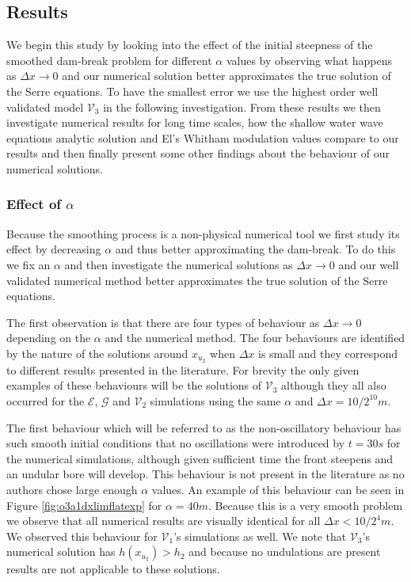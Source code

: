 \documentclass[SingleSpace,12pt,Journal]{Serre_ASCE}
\begin{document}

\subsection{Results}

We begin this study by looking into the effect of the initial steepness of the smoothed dam-break problem for different $\alpha$ values by observing what happens as $\Delta x \rightarrow 0$ and our numerical solution better approximates the true solution of the Serre equations. To have the smallest error we use the highest order well validated model $\mathcal{V}_3$ in the following investigation. From these results we then investigate numerical results for long time scales, how the shallow water wave equations analytic solution and El's Whitham modulation values compare to our results and then finally present some other findings about the behaviour of our numerical solutions.

\subsubsection{Effect of $\alpha$}
Because the smoothing process is a non-physical numerical tool we first study its effect by decreasing $\alpha$ and thus better approximating the dam-break. To do this we fix an $\alpha$ and then investigate the numerical solutions as $\Delta x \rightarrow 0$ and our well validated numerical method better approximates the true solution of the Serre equations. 

The first observation is that there are four types of behaviour as $\Delta x \rightarrow 0$ depending on the $\alpha$ and the numerical method. The four behaviours are identified by the nature of the solutions around $x_{u_2}$ when $\Delta x$ is small and they correspond to different results presented in the literature. For brevity the only given examples of these behaviours will be the solutions of $\mathcal{V}_3$ although they all also occurred for the $\mathcal{E}$, $\mathcal{G}$ and $\mathcal{V}_2$ simulations using the same $\alpha$ and $\Delta x = 10/2^{10}m$.

The first behaviour which will be referred to as the non-oscillatory behaviour has such smooth initial conditions that no oscillations were introduced by $t= 30s$ for the numerical simulations, although given sufficient time the front steepens and an undular bore will develop. This behaviour is not present in the literature as no authors chose large enough $\alpha$ values. An example of this behaviour can be seen in Figure \ref{fig:o3a1dxlimflatexp} for $\alpha = 40m$. Because this is a very smooth problem we observe that all numerical results are visually identical for all $\Delta x < 10 / 2^4m$. We observed this behaviour for $\mathcal{V}_1$'s simulations as well. We note that $\mathcal{V}_3$'s numerical solution has $h(x_{u_2}) > h_2$ and because no undulations are present  results are not applicable to these solutions.   
\end{document}
